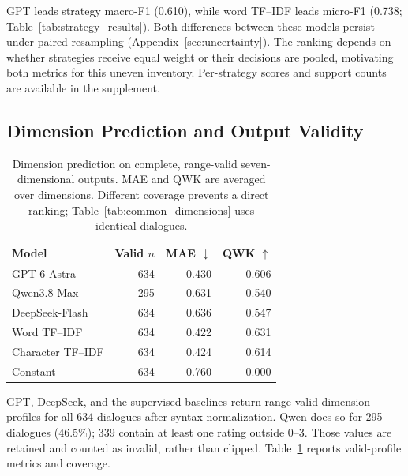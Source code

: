 \documentclass[11pt]{article}
\begin{document}
GPT leads strategy macro-F1 (0.610), while word TF--IDF leads micro-F1
(0.738; Table~\ref{tab:strategy_results}). Both differences between these
models persist under paired resampling (Appendix~\ref{sec:uncertainty}).
The ranking depends on whether strategies receive equal weight or their
decisions are pooled, motivating both metrics for this uneven inventory.
Per-strategy scores and support counts are available in the supplement.

\subsection{Dimension Prediction and Output Validity}
\begin{table}[t]
\centering\small
\setlength{\tabcolsep}{3pt}
\begin{tabular}{@{}lrrr@{}}
\toprule
Model & Valid $n$ & MAE $\downarrow$ & QWK $\uparrow$\\
\midrule
GPT-6 Astra & 634 & 0.430 & 0.606\\
Qwen3.8-Max & 295 & 0.631 & 0.540\\
DeepSeek-Flash & 634 & 0.636 & 0.547\\
Word TF--IDF & 634 & 0.422 & 0.631\\
Character TF--IDF & 634 & 0.424 & 0.614\\
Constant & 634 & 0.760 & 0.000\\
\bottomrule
\end{tabular}
\caption{Dimension prediction on complete, range-valid seven-dimensional outputs. MAE and QWK are averaged over dimensions. Different coverage prevents a direct ranking; Table~\ref{tab:common_dimensions} uses identical dialogues.}
\label{tab:dimension_results}
\end{table}
GPT, DeepSeek, and the supervised baselines return range-valid dimension
profiles for all 634 dialogues after syntax normalization. Qwen does so for
295 dialogues (46.5\%); 339 contain at least one rating outside 0--3.
Those values are retained and counted as invalid, rather than clipped.
Table~\ref{tab:dimension_results} reports valid-profile metrics and coverage.
\end{document}
